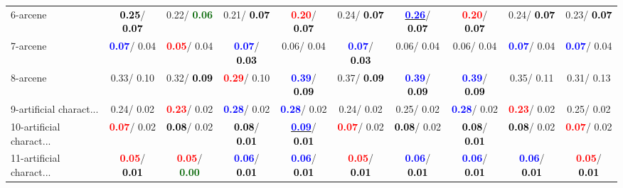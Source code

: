 \begin{table}[h]
\begin{center}
{\begin{tabular}{lc|c|c|c|c|c|c|c|c}
6-arcene & \textcolor{black}{\textbf{  0.25}}/\textcolor{black}{\textbf{  0.07}} &   0.22/\textcolor{darkgreen}{\textbf{  0.06}} &   0.21/\textcolor{black}{\textbf{  0.07}} & \textcolor{red}{\textbf{  0.20}}/\textcolor{black}{\textbf{  0.07}} &   0.24/\textcolor{black}{\textbf{  0.07}} & \underline{\textcolor{blue}{\textbf{  0.26}}}/\textcolor{black}{\textbf{  0.07}} & \textcolor{red}{\textbf{  0.20}}/\textcolor{black}{\textbf{  0.07}} &   0.24/\textcolor{black}{\textbf{  0.07}} &   0.23/\textcolor{black}{\textbf{  0.07}} \\
7-arcene & \textcolor{blue}{\textbf{  0.07}}/  0.04 & \textcolor{red}{\textbf{  0.05}}/  0.04 & \textcolor{blue}{\textbf{  0.07}}/\textcolor{black}{\textbf{  0.03}} &   0.06/  0.04 & \textcolor{blue}{\textbf{  0.07}}/\textcolor{black}{\textbf{  0.03}} &   0.06/  0.04 &   0.06/  0.04 & \textcolor{blue}{\textbf{  0.07}}/  0.04 & \textcolor{blue}{\textbf{  0.07}}/  0.04 \\ \hline
8-arcene &   0.33/  0.10 &   0.32/\textcolor{black}{\textbf{  0.09}} & \textcolor{red}{\textbf{  0.29}}/  0.10 & \textcolor{blue}{\textbf{  0.39}}/\textcolor{black}{\textbf{  0.09}} &   0.37/\textcolor{black}{\textbf{  0.09}} & \textcolor{blue}{\textbf{  0.39}}/\textcolor{black}{\textbf{  0.09}} & \textcolor{blue}{\textbf{  0.39}}/\textcolor{black}{\textbf{  0.09}} &   0.35/  0.11 &   0.31/  0.13 \\
9-artificial charact... &   0.24/  0.02 & \textcolor{red}{\textbf{  0.23}}/  0.02 & \textcolor{blue}{\textbf{  0.28}}/  0.02 & \textcolor{blue}{\textbf{  0.28}}/  0.02 &   0.24/  0.02 &   0.25/  0.02 & \textcolor{blue}{\textbf{  0.28}}/  0.02 & \textcolor{red}{\textbf{  0.23}}/  0.02 &   0.25/  0.02 \\
10-artificial charact... & \textcolor{red}{\textbf{  0.07}}/  0.02 & \textcolor{black}{\textbf{  0.08}}/  0.02 & \textcolor{black}{\textbf{  0.08}}/\textcolor{black}{\textbf{  0.01}} & \underline{\textcolor{blue}{\textbf{  0.09}}}/\textcolor{black}{\textbf{  0.01}} & \textcolor{red}{\textbf{  0.07}}/  0.02 & \textcolor{black}{\textbf{  0.08}}/  0.02 & \textcolor{black}{\textbf{  0.08}}/\textcolor{black}{\textbf{  0.01}} & \textcolor{black}{\textbf{  0.08}}/  0.02 & \textcolor{red}{\textbf{  0.07}}/  0.02 \\
11-artificial charact... & \textcolor{red}{\textbf{  0.05}}/\textcolor{black}{\textbf{  0.01}} & \textcolor{red}{\textbf{  0.05}}/\textcolor{darkgreen}{\textbf{  0.00}} & \textcolor{blue}{\textbf{  0.06}}/\textcolor{black}{\textbf{  0.01}} & \textcolor{blue}{\textbf{  0.06}}/\textcolor{black}{\textbf{  0.01}} & \textcolor{red}{\textbf{  0.05}}/\textcolor{black}{\textbf{  0.01}} & \textcolor{blue}{\textbf{  0.06}}/\textcolor{black}{\textbf{  0.01}} & \textcolor{blue}{\textbf{  0.06}}/\textcolor{black}{\textbf{  0.01}} & \textcolor{blue}{\textbf{  0.06}}/\textcolor{black}{\textbf{  0.01}} & \textcolor{red}{\textbf{  0.05}}/\textcolor{black}{\textbf{  0.01}} \\

\end{tabular}}
\end{center}
\end{table}
